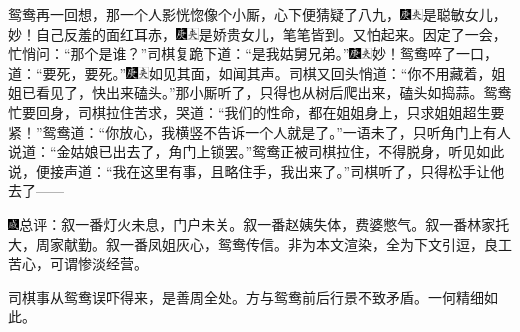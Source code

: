 鸳鸯再一回想，那一个人影恍惚像个小厮，心下便猜疑了八九，{\includegraphics[width=3mm]{../Images/00004}\includegraphics[width=3mm]{../Images/00012}\footnotesize \kaishu 是聪敏女儿，妙！}自己反羞的面红耳赤，{\includegraphics[width=3mm]{../Images/00004}\includegraphics[width=3mm]{../Images/00012}\footnotesize \kaishu 是娇贵女儿，笔笔皆到。}又怕起来。因定了一会，忙悄问：“那个是谁？”司棋复跪下道：“是我姑舅兄弟。”{\includegraphics[width=3mm]{../Images/00004}\includegraphics[width=3mm]{../Images/00012}\footnotesize \kaishu 妙！}鸳鸯啐了一口，道：“要死，要死。”{\includegraphics[width=3mm]{../Images/00004}\includegraphics[width=3mm]{../Images/00012}\footnotesize \kaishu 如见其面，如闻其声。}司棋又回头悄道：“你不用藏着，姐姐已看见了，快出来磕头。”那小厮听了，只得也从树后爬出来，磕头如捣蒜。鸳鸯忙要回身，司棋拉住苦求，哭道：“我们的性命，都在姐姐身上，只求姐姐超生要紧！”鸳鸯道：“你放心，我横竖不告诉一个人就是了。”一语未了，只听角门上有人说道：“金姑娘已出去了，角门上锁罢。”鸳鸯正被司棋拉住，不得脱身，听见如此说，便接声道：“我在这里有事，且略住手，我出来了。”司棋听了，只得松手让他去了------

{\includegraphics[width=3mm]{../Images/00005}\kaishu 总评：叙一番灯火未息，门户未关。叙一番赵姨失体，费婆憋气。叙一番林家托大，周家献勤。叙一番凤姐灰心，鸳鸯传信。非为本文渲染，全为下文引逗，良工苦心，可谓惨淡经营。}

{\kaishu 司棋事从鸳鸯误吓得来，是善周全处。方与鸳鸯前后行景不致矛盾。一何精细如此。}
